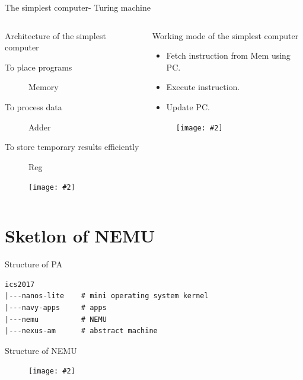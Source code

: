 \documentclass{beamer}
\title{\titletext}
\subtitle{PA1-1}
\author{Xie}
\institute{xiemhemail@gmail.com}
\date{Sep ??, 2017}
\newcommand{\fignocaption}[2]{
	\begin{figure}[htp]
		\centering
		\texttt{[image: \#2]}
	\end{figure}
}
\begin{document}
	\maketitle

\begin{frame}{The simplest computer- Turing machine}
	\begin{columns}
		\begin{column}{0.5\textwidth}
			\begin{block}{Architecture of the simplest computer }
				\begin{description}
					\item[To place programs] Memory
					\item[To process data]Adder
					\item[To store temporary results efficiently]Reg
				\end{description}
			\end{block}
			\fignocaption{scale=0.4}{trm.png}
			
		\end{column}
		\begin{column}{0.5\textwidth}
			\begin{block}{Working mode of the simplest computer}
				\begin{itemize}
					\item Fetch instruction from Mem using PC.
					\item Execute instruction.
					\item Update PC.
				\end{itemize}
			\end{block}
			\fignocaption{scale=0.5}{tapemachine.jpg}
		\end{column}
	\end{columns}
\end{frame}

\section{Sketlon of NEMU}
\begin{frame}[fragile]{Structure of PA}
\begin{verbatim}
ics2017
|---nanos-lite    # mini operating system kernel
|---navy-apps     # apps
|---nemu          # NEMU
|---nexus-am      # abstract machine
\end{verbatim}
\end{frame}

\begin{frame}{Structure of NEMU}
\fignocaption{scale=0.3}{structureOfNEMU.png}
\end{frame}
\end{document}
